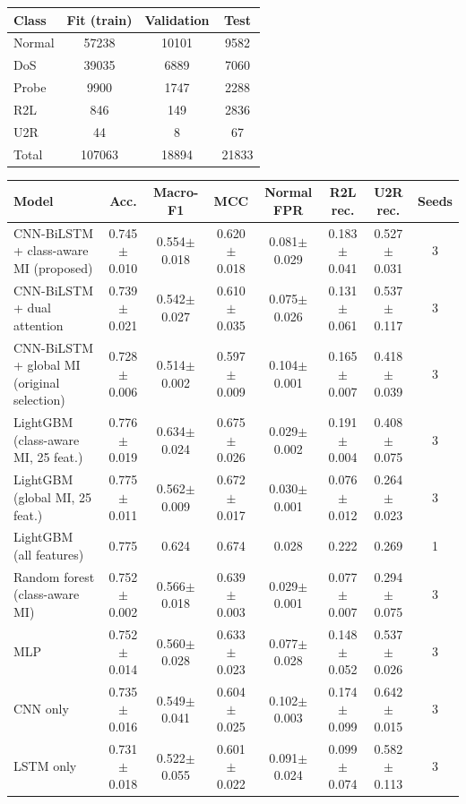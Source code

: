 \begin{tabular}{lccc}
\toprule
Class & Fit (train) & Validation & Test \\
\midrule
Normal & 57238 & 10101 & 9582 \\
DoS & 39035 & 6889 & 7060 \\
Probe & 9900 & 1747 & 2288 \\
R2L & 846 & 149 & 2836 \\
U2R & 44 & 8 & 67 \\
Total & 107063 & 18894 & 21833 \\
\bottomrule
\end{tabular}

\begin{tabular}{lccccccc}
\toprule
Model & Acc. & Macro-F1 & MCC & Normal FPR & R2L rec. & U2R rec. & Seeds \\
\midrule
CNN-BiLSTM + class-aware MI (proposed) & 0.745$\pm$0.010 & 0.554$\pm$0.018 & 0.620$\pm$0.018 & 0.081$\pm$0.029 & 0.183$\pm$0.041 & 0.527$\pm$0.031 & 3 \\
CNN-BiLSTM + dual attention & 0.739$\pm$0.021 & 0.542$\pm$0.027 & 0.610$\pm$0.035 & 0.075$\pm$0.026 & 0.131$\pm$0.061 & 0.537$\pm$0.117 & 3 \\
CNN-BiLSTM + global MI (original selection) & 0.728$\pm$0.006 & 0.514$\pm$0.002 & 0.597$\pm$0.009 & 0.104$\pm$0.001 & 0.165$\pm$0.007 & 0.418$\pm$0.039 & 3 \\
LightGBM (class-aware MI, 25 feat.) & 0.776$\pm$0.019 & 0.634$\pm$0.024 & 0.675$\pm$0.026 & 0.029$\pm$0.002 & 0.191$\pm$0.004 & 0.408$\pm$0.075 & 3 \\
LightGBM (global MI, 25 feat.) & 0.775$\pm$0.011 & 0.562$\pm$0.009 & 0.672$\pm$0.017 & 0.030$\pm$0.001 & 0.076$\pm$0.012 & 0.264$\pm$0.023 & 3 \\
LightGBM (all features) & 0.775 & 0.624 & 0.674 & 0.028 & 0.222 & 0.269 & 1 \\
Random forest (class-aware MI) & 0.752$\pm$0.002 & 0.566$\pm$0.018 & 0.639$\pm$0.003 & 0.029$\pm$0.001 & 0.077$\pm$0.007 & 0.294$\pm$0.075 & 3 \\
MLP & 0.752$\pm$0.014 & 0.560$\pm$0.028 & 0.633$\pm$0.023 & 0.077$\pm$0.028 & 0.148$\pm$0.052 & 0.537$\pm$0.026 & 3 \\
CNN only & 0.735$\pm$0.016 & 0.549$\pm$0.041 & 0.604$\pm$0.025 & 0.102$\pm$0.003 & 0.174$\pm$0.099 & 0.642$\pm$0.015 & 3 \\
LSTM only & 0.731$\pm$0.018 & 0.522$\pm$0.055 & 0.601$\pm$0.022 & 0.091$\pm$0.024 & 0.099$\pm$0.074 & 0.582$\pm$0.113 & 3 \\
\bottomrule
\end{tabular}

